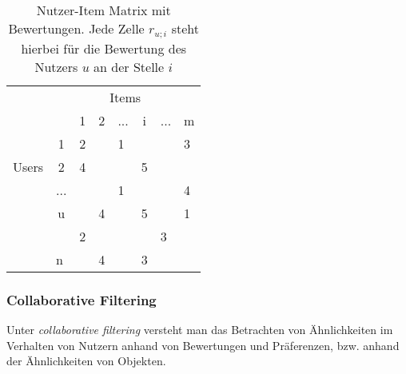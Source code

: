 \begin{table}[]
	\centering
	\label{Recommendation Matrix}
	\begin{tabular}{lcllllll}
		& \multicolumn{7}{c}{Items}                                                                                                                                                        \\
		& \multicolumn{1}{l}{}     & \multicolumn{1}{c}{1}  & \multicolumn{1}{c}{2}  & \multicolumn{1}{c}{...} & \multicolumn{1}{c}{i}  & \multicolumn{1}{c}{...} & \multicolumn{1}{c}{m}  \\ \cline{3-8} 
		& \multicolumn{1}{c|}{1}   & \multicolumn{1}{l|}{2} & \multicolumn{1}{l|}{}  & \multicolumn{1}{l|}{1}  & \multicolumn{1}{l|}{}  & \multicolumn{1}{l|}{}   & \multicolumn{1}{l|}{3} \\ \cline{3-8} 
		Users & \multicolumn{1}{c|}{2}   & \multicolumn{1}{l|}{4} & \multicolumn{1}{l|}{}  & \multicolumn{1}{l|}{}   & \multicolumn{1}{l|}{5} & \multicolumn{1}{l|}{}   & \multicolumn{1}{l|}{}  \\ \cline{3-8} 
		& \multicolumn{1}{c|}{...} & \multicolumn{1}{l|}{}  & \multicolumn{1}{l|}{}  & \multicolumn{1}{l|}{1}  & \multicolumn{1}{l|}{}  & \multicolumn{1}{l|}{}   & \multicolumn{1}{l|}{4} \\ \cline{3-8} 
		& \multicolumn{1}{c|}{u}   & \multicolumn{1}{l|}{}  & \multicolumn{1}{l|}{4} & \multicolumn{1}{l|}{}   & \multicolumn{1}{l|}{5} & \multicolumn{1}{l|}{}   & \multicolumn{1}{l|}{1} \\ \cline{3-8} 
		& \multicolumn{1}{l|}{}    & \multicolumn{1}{l|}{2} & \multicolumn{1}{l|}{}  & \multicolumn{1}{l|}{}   & \multicolumn{1}{l|}{}  & \multicolumn{1}{l|}{3}  & \multicolumn{1}{l|}{}  \\ \cline{3-8} 
		& \multicolumn{1}{l|}{n}   & \multicolumn{1}{l|}{}  & \multicolumn{1}{l|}{4} & \multicolumn{1}{l|}{}   & \multicolumn{1}{l|}{3} & \multicolumn{1}{l|}{}   & \multicolumn{1}{l|}{}  \\ \cline{3-8} 
	\end{tabular}
	\caption{Nutzer-Item Matrix mit Bewertungen. Jede Zelle $r_{u;i}$ steht hierbei für die Bewertung des Nutzers $u$ an der Stelle $i$}
\end{table}

\subsubsection{Collaborative Filtering}
Unter \textit{collaborative filtering} versteht man das Betrachten von Ähnlichkeiten im Verhalten von Nutzern anhand von Bewertungen und Präferenzen, bzw. anhand der Ähnlichkeiten von Objekten.

